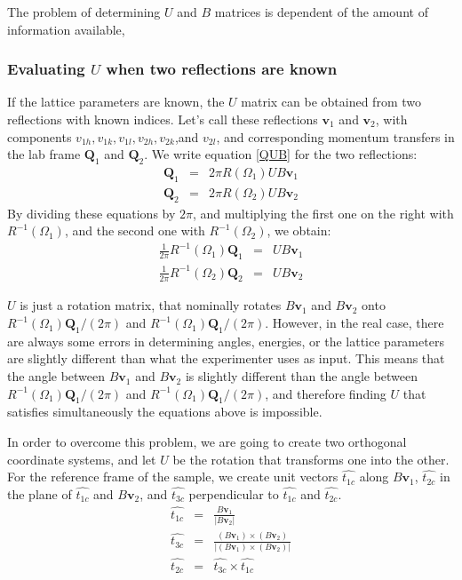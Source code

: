 \documentclass[prb]{revtex4}%
\begin{document}
The problem of determining $U$ and $B$ matrices is dependent of the amount of information available,

\subsubsection{Evaluating $U$ when two reflections are known}

If the lattice parameters are known, the $U$ matrix can be obtained from
two reflections with known indices. Let's call these reflections $\textbf{v}_1$ and $\textbf{v}_2$,
with components $v_{1h}, v_{1k}, v_{1l}, v_{2h}, v_{2k}$,and $v_{2l}$, and corresponding momentum
transfers in the lab frame $\textbf{Q}_1$ and $\textbf{Q}_2$. We write equation \ref{QUB} for the two reflections:
\begin{eqnarray}
  \textbf{Q}_1 &=& 2 \pi R(\Omega_1) U B \textbf{v}_1 \\
  \textbf{Q}_2 &=& 2 \pi R(\Omega_2) U B \textbf{v}_2
\end{eqnarray}
By dividing these equations by $2\pi$, and multiplying the first one on the right with $R^{-1}(\Omega_1)$,
and the second one with $R^{-1}(\Omega_2)$, we obtain:
\begin{eqnarray}
  \frac{1}{2 \pi} R^{-1}(\Omega_1)\textbf{Q}_1 &=&   U B \textbf{v}_1 \\
  \frac{1}{2 \pi} R^{-1}(\Omega_2)\textbf{Q}_2 &=&   U B \textbf{v}_2
\end{eqnarray}

$U$ is just a rotation matrix, that nominally rotates $B \textbf{v}_1$ and $ B \textbf{v}_2$ onto
$R^{-1}(\Omega_1)\textbf{Q}_1/(2\pi)$ and $R^{-1}(\Omega_1)\textbf{Q}_1/(2\pi)$. However, in the real case,
there are always some errors in determining angles, energies, or the lattice parameters are slightly different than
what the experimenter uses as input. This means that the angle between $B \textbf{v}_1$ and $ B \textbf{v}_2$ is
slightly different than the angle between $R^{-1}(\Omega_1)\textbf{Q}_1/(2\pi)$ and $R^{-1}(\Omega_1)\textbf{Q}_1/(2\pi)$,
and therefore finding $U$ that satisfies simultaneously the equations above is impossible.

In order to overcome this problem, we are going to create two orthogonal coordinate systems, and let $U$ be the rotation that
transforms one into the other. For the reference frame of the sample, we create unit vectors $\widehat{t_{1c}}$ along $B \textbf{v}_1$,
$\widehat{t_{2c}}$ in the plane of $\widehat{t_{1c}}$ and $B \textbf{v}_2$, and $\widehat{t_{3c}}$ perpendicular to $\widehat{t_{1c}}$
and $\widehat{t_{2c}}$.
\begin{eqnarray}
  \widehat{t_{1c}} &=& \frac{B \textbf{v}_1}{|B \textbf{v}_2|} \\
  \widehat{t_{3c}} &=& \frac{(B \textbf{v}_1)\times(B \textbf{v}_2)}{|(B \textbf{v}_1)\times(B \textbf{v}_2)|} \\
  \widehat{t_{2c}} &=& \widehat{t_{3c}}\times \widehat{t_{1c}}
\end{eqnarray}
\end{document}
